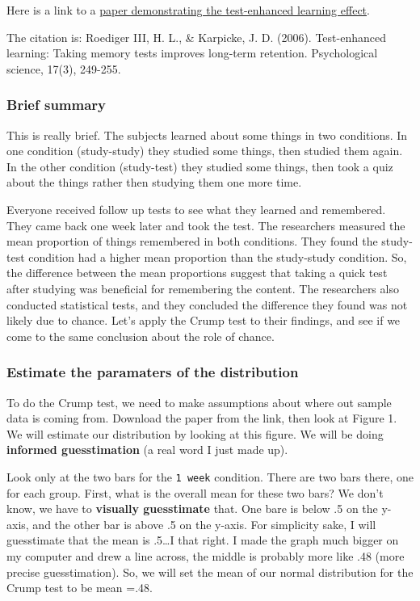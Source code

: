 \documentclass[]{book}
\theoremstyle{definition}
\theoremstyle{definition}
\theoremstyle{definition}
\theoremstyle{remark}
\begin{document}
Here is a link to a
\href{https://www.jstor.org/stable/pdf/40064526.pdf?casa_token=jMQnevvTRoIAAAAA:J96DQ0EHWCDKvjV3D-OdQ7TFnJ_DTZEz_G6zG1YMstqGu7fuzjzM0V4PiNREvB1sfLxTXn68FpHhoIUFpOx9p5fjsB7hcqQTUCQix9jxdj_hx-zqoZ8}{paper
demonstrating the test-enhanced learning effect}.

The citation is: Roediger III, H. L., \& Karpicke, J. D. (2006).
Test-enhanced learning: Taking memory tests improves long-term
retention. Psychological science, 17(3), 249-255.

\subsubsection{Brief summary}\label{brief-summary}

This is really brief. The subjects learned about some things in two
conditions. In one condition (study-study) they studied some things,
then studied them again. In the other condition (study-test) they
studied some things, then took a quiz about the things rather then
studying them one more time.

Everyone received follow up tests to see what they learned and
remembered. They came back one week later and took the test. The
researchers measured the mean proportion of things remembered in both
conditions. They found the study-test condition had a higher mean
proportion than the study-study condition. So, the difference between
the mean proportions suggest that taking a quick test after studying was
beneficial for remembering the content. The researchers also conducted
statistical tests, and they concluded the difference they found was not
likely due to chance. Let's apply the Crump test to their findings, and
see if we come to the same conclusion about the role of chance.

\subsubsection{Estimate the paramaters of the
distribution}\label{estimate-the-paramaters-of-the-distribution}

To do the Crump test, we need to make assumptions about where out sample
data is coming from. Download the paper from the link, then look at
Figure 1. We will estimate our distribution by looking at this figure.
We will be doing \textbf{informed guesstimation} (a real word I just
made up).

Look only at the two bars for the \texttt{1\ week} condition. There are
two bars there, one for each group. First, what is the overall mean for
these two bars? We don't know, we have to \textbf{visually guesstimate}
that. One bare is below .5 on the y-axis, and the other bar is above .5
on the y-axis. For simplicity sake, I will guesstimate that the mean is
.5\ldots{}I that right. I made the graph much bigger on my computer and
drew a line across, the middle is probably more like .48 (more precise
guesstimation). So, we will set the mean of our normal distribution for
the Crump test to be mean =.48.
\end{document}
